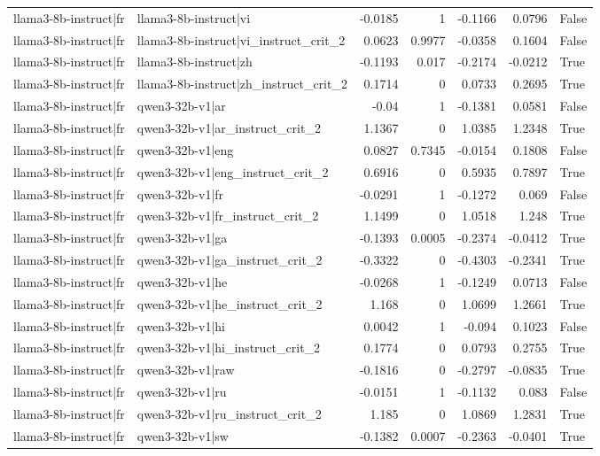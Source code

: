 \begin{table}
\begin{tabular}{l l r r r r l}
llama3-8b-instruct|fr & llama3-8b-instruct|vi & -0.0185 & 1 & -0.1166 & 0.0796 & False \\
llama3-8b-instruct|fr & llama3-8b-instruct|vi_instruct_crit_2 & 0.0623 & 0.9977 & -0.0358 & 0.1604 & False \\
llama3-8b-instruct|fr & llama3-8b-instruct|zh & -0.1193 & 0.017 & -0.2174 & -0.0212 & True \\
llama3-8b-instruct|fr & llama3-8b-instruct|zh_instruct_crit_2 & 0.1714 & 0 & 0.0733 & 0.2695 & True \\
llama3-8b-instruct|fr & qwen3-32b-v1|ar & -0.04 & 1 & -0.1381 & 0.0581 & False \\
llama3-8b-instruct|fr & qwen3-32b-v1|ar_instruct_crit_2 & 1.1367 & 0 & 1.0385 & 1.2348 & True \\
llama3-8b-instruct|fr & qwen3-32b-v1|eng & 0.0827 & 0.7345 & -0.0154 & 0.1808 & False \\
llama3-8b-instruct|fr & qwen3-32b-v1|eng_instruct_crit_2 & 0.6916 & 0 & 0.5935 & 0.7897 & True \\
llama3-8b-instruct|fr & qwen3-32b-v1|fr & -0.0291 & 1 & -0.1272 & 0.069 & False \\
llama3-8b-instruct|fr & qwen3-32b-v1|fr_instruct_crit_2 & 1.1499 & 0 & 1.0518 & 1.248 & True \\
llama3-8b-instruct|fr & qwen3-32b-v1|ga & -0.1393 & 0.0005 & -0.2374 & -0.0412 & True \\
llama3-8b-instruct|fr & qwen3-32b-v1|ga_instruct_crit_2 & -0.3322 & 0 & -0.4303 & -0.2341 & True \\
llama3-8b-instruct|fr & qwen3-32b-v1|he & -0.0268 & 1 & -0.1249 & 0.0713 & False \\
llama3-8b-instruct|fr & qwen3-32b-v1|he_instruct_crit_2 & 1.168 & 0 & 1.0699 & 1.2661 & True \\
llama3-8b-instruct|fr & qwen3-32b-v1|hi & 0.0042 & 1 & -0.094 & 0.1023 & False \\
llama3-8b-instruct|fr & qwen3-32b-v1|hi_instruct_crit_2 & 0.1774 & 0 & 0.0793 & 0.2755 & True \\
llama3-8b-instruct|fr & qwen3-32b-v1|raw & -0.1816 & 0 & -0.2797 & -0.0835 & True \\
llama3-8b-instruct|fr & qwen3-32b-v1|ru & -0.0151 & 1 & -0.1132 & 0.083 & False \\
llama3-8b-instruct|fr & qwen3-32b-v1|ru_instruct_crit_2 & 1.185 & 0 & 1.0869 & 1.2831 & True \\
llama3-8b-instruct|fr & qwen3-32b-v1|sw & -0.1382 & 0.0007 & -0.2363 & -0.0401 & True \\

\end{tabular}
\end{table}
